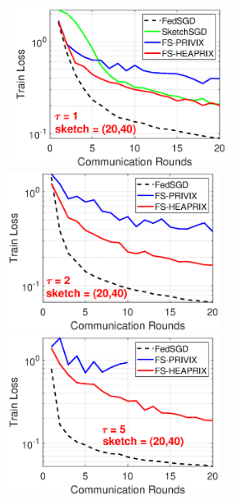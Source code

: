 \documentclass[twoside]{article}
\begin{document}
\begin{figure}[H]
	\begin{center}
		\mbox{	\hspace{-0.15in}			  
		 \includegraphics[width=2.2in]{MNIST_figures/local1_sketch20_iid1_train_loss.eps} \hspace{-0.15in}
		\includegraphics[width=2.2in]{MNIST_figures/local2_sketch20_iid1_train_loss.eps} \hspace{-0.15in}
		\includegraphics[width=2.2in]{MNIST_figures/local5_sketch20_iid1_train_loss.eps}}
		

\end{center}
\end{figure}
\end{document}
